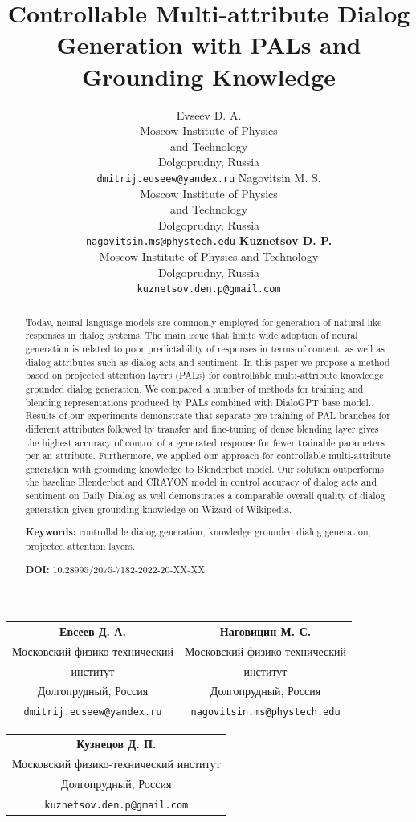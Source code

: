 \documentclass[11pt]{article}
\title{Controllable Multi-attribute Dialog Generation with PALs and Grounding Knowledge}
\author{Evseev D. A. \\
  Moscow Institute of Physics \\
  and Technology \\
  Dolgoprudny, Russia \\
  {\tt dmitrij.euseew@yandex.ru} \And
  Nagovitsin M. S. \\
  Moscow Institute of Physics \\
  and Technology \\
  Dolgoprudny, Russia \\
  {\tt nagovitsin.ms@phystech.edu}
  \AND
  {\bf Kuznetsov D. P.} \\
  Moscow Institute of Physics and Technology \\
  Dolgoprudny, Russia \\
  {\tt kuznetsov.den.p@gmail.com} \\
  }
\date{}
\begin{document}
\maketitle
\begin{abstract}
Today, neural language models are commonly employed for generation of natural like responses in dialog systems. The main issue that limits wide adoption of neural generation is related to poor predictability of responses in terms of content, as well as dialog attributes such as dialog acts and sentiment.
In this paper we propose a method based on projected attention layers (PALs) for controllable multi-attribute knowledge grounded dialog generation. We compared a number of methods for training and blending representations produced by PALs combined with DialoGPT base model. Results of our experiments demonstrate that separate pre-training of PAL branches for different attributes followed by transfer and fine-tuning of dense blending layer gives the highest accuracy of control of a generated response for fewer trainable parameters per an attribute. Furthermore, we applied our approach for controllable multi-attribute generation with grounding knowledge to Blenderbot model. Our solution outperforms the baseline Blenderbot and CRAYON model in control accuracy of dialog acts and sentiment on Daily Dialog as well demonstrates a comparable overall quality  of dialog generation given grounding knowledge on Wizard of Wikipedia.
  
\textbf{Keywords:} controllable dialog generation, knowledge grounded dialog generation, projected attention layers.

\textbf{DOI:} 10.28995/2075-7182-2022-20-XX-XX
\end{abstract}

\begin{center}

  \medskip \setlength\tabcolsep{1cm}
  \begin{tabular}{cc}
    \textbf{Евсеев Д. А.} & \textbf{Наговицин М. С.}\\
      Московский физико-технический & Московский физико-технический\\
      институт & институт \\
      Долгопрудный, Россия & Долгопрудный, Россия\\
      {\tt dmitrij.euseew@yandex.ru} & {\tt nagovitsin.ms@phystech.edu}
  \end{tabular}
  \begin{tabular}{c}
    \textbf{Кузнецов Д. П.}\\
      Московский физико-технический институт\\
      Долгопрудный, Россия\\
      {\tt kuznetsov.den.p@gmail.com}
  \end{tabular}
  \medskip
\end{center}
\end{document}
